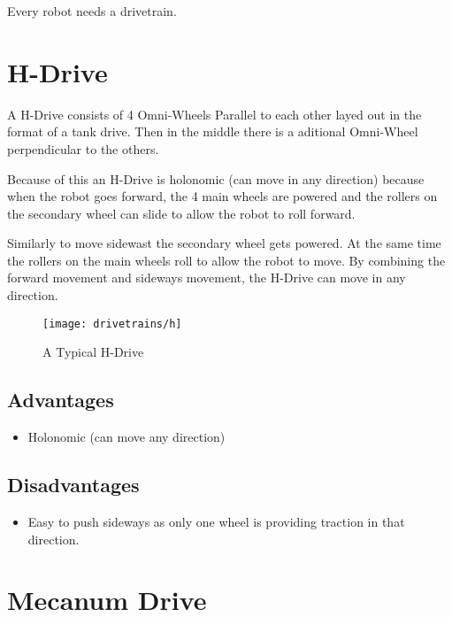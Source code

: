 \documentclass[../../main.tex]{subfiles}
\begin{document}
Every robot needs a drivetrain.

\section{H-Drive}

A H-Drive consists of 4 Omni-Wheels Parallel to each other layed out in the
format of a tank drive. Then in the middle there is a aditional Omni-Wheel
perpendicular to the others.\par

Because of this an H-Drive is holonomic (can move in any direction) because when
the robot goes forward, the 4 main wheels are powered and the rollers on the secondary
wheel can slide to allow the robot to roll forward. \par

Similarly to move sidewast the secondary wheel gets powered. At the same time the rollers on
the main wheels roll to allow the robot to move. By combining the forward movement and sideways
movement, the H-Drive can move in any direction.

\begin{figure}[h]
	\centering
	\texttt{[image: drivetrains/h]}
	\caption{A Typical H-Drive}
	\label{fig:drivetrainh}
\end{figure}

\subsection{Advantages}

\begin{itemize}
	\item Holonomic (can move any direction)
\end{itemize}


\subsection{Disadvantages}

\begin{itemize}
	\item Easy to push sideways as only one wheel is providing
	      traction in that direction.
\end{itemize}


\section{Mecanum Drive}
\end{document}
